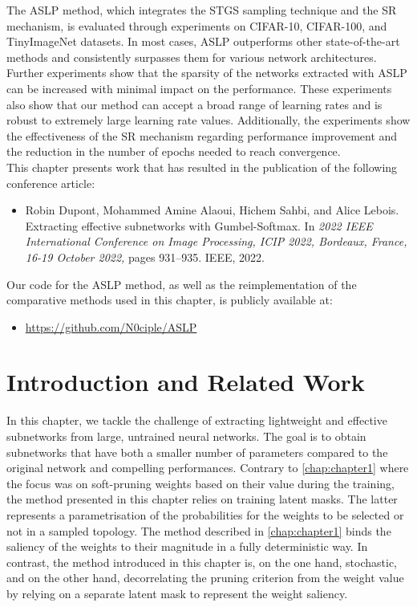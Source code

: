 \begin{adjustwidth}{1.5cm}{1.5cm}
  The \ac{ASLP} method, which integrates the \ac{STGS} sampling technique and
  the \ac{SR} mechanism, is evaluated through experiments on CIFAR-10,
  CIFAR-100, and TinyImageNet datasets. In most cases, \ac{ASLP} outperforms
  other state-of-the-art methods and consistently surpasses them for various
  network architectures. Further experiments show that the sparsity of the
  networks extracted with \ac{ASLP} can be increased with minimal impact on the
  performance. These experiments also show that our method can accept a broad
  range of learning rates and is robust to extremely large learning rate values.
  Additionally, the experiments show the effectiveness of the \ac{SR} mechanism
  regarding performance improvement and the reduction in the number of epochs
  needed to reach convergence.\\

  \noindent This chapter presents work that has resulted in the publication of the
  following conference article:
  \begin{itemize}
    \item Robin Dupont, Mohammed Amine Alaoui, Hichem Sahbi, and Alice
          Lebois. Extracting effective subnetworks with Gumbel-Softmax. In \textit{2022
            IEEE International Conference on Image Processing, ICIP 2022, Bordeaux,
            France, 16-19 October 2022,} pages 931–935. IEEE, 2022.
  \end{itemize}

  \noindent Our code for the \ac{ASLP} method, as well as the reimplementation
  of the comparative methods used in this chapter, is publicly available at:
  \begin{itemize}
    \item \url{https://github.com/N0ciple/ASLP}
  \end{itemize}

\end{adjustwidth}

\section{Introduction and Related Work}

In this chapter, we tackle the challenge of extracting lightweight and effective
subnetworks from large, untrained neural networks. The goal is to obtain
subnetworks that have both a smaller number of parameters compared to the
original network and compelling performances. Contrary to \cref{chap:chapter1}
where the focus was on soft-pruning weights based on their value during the
training, the method presented in this chapter relies on training latent masks.
The latter represents a parametrisation of the probabilities for the weights to
be selected or not in a sampled topology. The method described in
\cref{chap:chapter1} binds the saliency of the weights to their magnitude in a
fully deterministic way. In contrast, the method introduced in this chapter is,
on the one hand, stochastic, and on the other hand, decorrelating the pruning
criterion from the weight value by relying on a separate latent mask to
represent the weight saliency.\\


